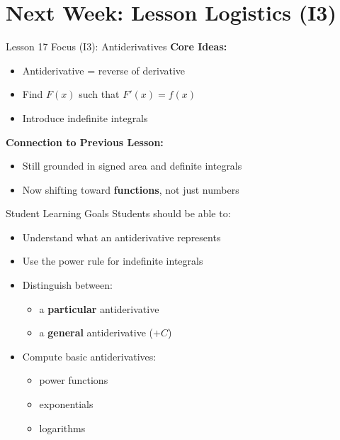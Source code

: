 \documentclass[dvipsnames]{beamer}
\begin{document}
\section{Next Week: Lesson Logistics (I3)}

\begin{frame}{Lesson 17 Focus (I3): Antiderivatives}
\textbf{Core Ideas:}
\begin{itemize}
\item Antiderivative = reverse of derivative
\item Find $F(x)$ such that $F'(x) = f(x)$
\item Introduce indefinite integrals
\end{itemize}

\vspace{0.3cm}

\textbf{Connection to Previous Lesson:}
\begin{itemize}
\item Still grounded in signed area and definite integrals
\item Now shifting toward \textbf{functions}, not just numbers
\end{itemize}
\end{frame}

\begin{frame}{Student Learning Goals}
Students should be able to:
\begin{itemize}
\item Understand what an antiderivative represents
\item Use the power rule for indefinite integrals
\item Distinguish between:
\begin{itemize}
\item a \textbf{particular} antiderivative
\item a \textbf{general} antiderivative ($+C$)
\end{itemize}
\item Compute basic antiderivatives:
\begin{itemize}
\item power functions
\item exponentials
\item logarithms
\end{itemize}
\end{itemize}
\end{frame}
\end{document}
